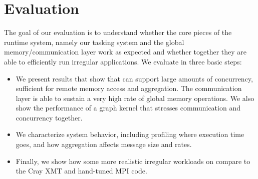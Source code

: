 \section{Evaluation}
\label{sec:evaluation}

The goal of our evaluation is to understand whether the core pieces of the \Grappa
runtime system, namely our tasking system and the global memory/communication
layer work as expected and whether together they are able to efficiently run irregular
applications. We evaluate \Grappa in three basic steps:

\begin{itemize}

\item We present results that show that \Grappa can
    support large amounts of concurrency, sufficient for remote memory
    access and aggregation. The communication layer is able to
    sustain a very high rate of global memory operations. We also show the performance of a
graph kernel that stresses communication and concurrency together.

\item We characterize system behavior, including
profiling where execution time goes, and how aggregation affects message size and
rates.


\item Finally, we show how some more realistic irregular workloads on \Grappa
compare to the Cray XMT and hand-tuned MPI code.

%
\end{itemize}

